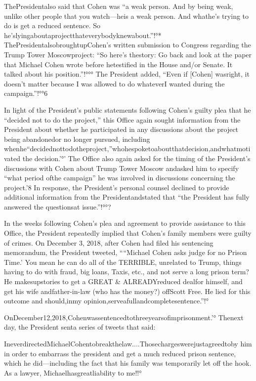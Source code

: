 ThePresidentalso said that Cohen was “a weak person. And by being weak, unlike other people that you watch—heis a weak person. And whathe’s trying to do is get a reduced sentence. So he’slyingaboutaprojectthateverybodyknewabout.”!°* ThePresidentalsobroughtupCohen’s written submission to Congress regarding the Trump Tower Moscowproject: “So here’s thestory: Go back and look at the paper that Michael Cohen wrote before hetestified in the House and/or Senate. It talked about his position.”!°°° The President added, “Even if [Cohen] wasright, it doesn’t matter because I was allowed to do whateverI wanted during the campaign.”!°°6

In light of the President’s public statements following Cohen’s guilty plea that he “decided not to do the project,” this Office again sought information from the President about whether he participated in any discussions about the project being abandonedor no longer pursued, including whenhe“decidednottodotheproject,”whohespoketoaboutthatdecision,andwhatmotivated
the decision.'°’ The Office also again asked for the timing of the President’s discussions with Cohen about Trump Tower Moscow andasked him to specify “what period ofthe campaign” he was involved in discussions concerning the project.'8 In response, the President’s personal counsel declined to provide additional information from the Presidentandstated that “the President has fully answered the questionsat issue.”!°°?

In the weeks following Cohen’s plea and agreement to provide assistance to this Office, the President repeatedly implied that Cohen’s family members were guilty of crimes. On December 3, 2018, after Cohen had filed his sentencing memorandum, the President tweeted, ““Michael Cohen asks judge for no Prison Time.’ You mean he can do all of the TERRIBLE, unrelated to Trump, things having to do with fraud, big loans, Taxis, etc., and not serve a long prison term? He makesupstories to get a GREAT & ALREADYreduced dealfor himself, and get his wife andfather-in-law (who has the money?) offScott Free. He lied for this outcome and should,inmy opinion,serveafullandcompletesentence.”!° 

OnDecember12,2018,Cohenwassentencedtothreeyearsofimprisonment.'° Thenext day, the President senta series of tweets that said:

IneverdirectedMichaelCohentobreakthelaw....Thosechargeswerejustagreedtoby him in order to embarrass the president and get a much reduced prison sentence, which he did—including the fact that his family was temporarily let off the hook. As a lawyer, Michaelhasgreatliability to me!!°

